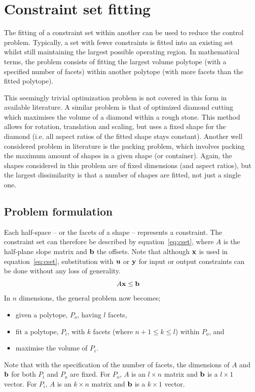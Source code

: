 \section{Constraint set fitting}\label{sec:confit}
The fitting of a constraint set within another can be used to reduce the control problem.
Typically, a set with fewer constraints is fitted into an existing set whilst still maintaining the largest possible operating region.
In mathematical terms, the problem consists of fitting the largest volume polytope (with a specified number of facets) within another polytope (with more facets than the fitted polytope).

This seemingly trivial optimization problem is not covered in this form in available literature.
A similar problem is that of optimized diamond cutting \citep{diamondcut} which maximises the volume of a diamond within a rough stone.
This method allows for rotation, translation and scaling, but uses a fixed shape for the diamond (i.e. all aspect ratios of the fitted shape stays constant).
Another well considered problem in literature is the packing problem, which involves packing the maximum amount of shapes in a given shape (or container).
Again, the shapes considered in this problem are of fixed dimensions (and aspect ratios), but the largest dissimilarity is that a number of shapes are fitted, not just a single one.

\subsection{Problem formulation}
Each half-space -- or the facets of a shape -- represents a constraint.
The constraint set can therefore be described by equation~\ref{eq:cset}, where $A$ is the half-plane slope matrix and ${\bf {b}}$ the offsets.
Note that although ${\bf {x}}$ is used in equation~\ref{eq:cset}, substitution with ${\bf {u}}$ or ${\bf {y}}$ for input or output constraints can be done without any loss of generality.
\begin{equation}
  \label{eq:cset}
  A{\bf {x}} \leq {\bf {b}}
\end{equation}
In $n$ dimensions, the general problem now becomes; 
\begin{itemize}
  \item given a polytope, $P_o$, having $l$ facets,
  \item fit a polytope, $P_i$, with $k$ facets (where $n+1 \leq k \le l$) within $P_o$, and
  \item maximise the volume of $P_i$.
\end{itemize} 
Note that with the specification of the number of facets, the dimensions of $A$ and ${\bf {b}}$ for both $P_i$ and $P_o$ are fixed.
For $P_o$, $A$ is an $l \times n$ matrix and ${\bf {b}}$ is a $l \times 1$ vector.
For $P_i$, $A$ is an $k \times n$ matrix and ${\bf {b}}$ is a $k \times 1$ vector.

